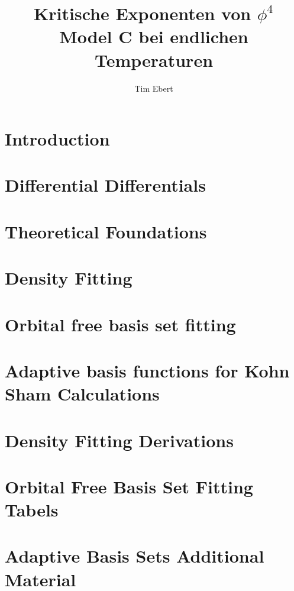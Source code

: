 \documentclass[12pt,twoside]{report}%
\author{Tim Ebert}
\title{Kritische Exponenten von $\phi^4$ Model C bei endlichen Temperaturen}
\begin{document}
\linespread{1.25}


\newpage
\tableofcontents
\chapter{Introduction} \label{chapter:introduction}

\chapter{Differential Differentials}

\chapter{Theoretical Foundations}

\chapter{Density Fitting} \label{chapter:densityfitting}

\chapter{Orbital free basis set fitting} \label{chapter:orbitalfreebasissetfitting}

\chapter{Adaptive basis functions for Kohn Sham Calculations} \label{chapter:adaptivebasisfunctions}

\begin{appendices}
    \chapter{Density Fitting Derivations}
    
    \chapter{Orbital Free Basis Set Fitting Tabels}
    
    \chapter{Adaptive Basis Sets Additional Material}
    
\end{appendices}
\printbibliography[heading=bibintoc, title={Complete bibliography}]
\clearpage
\newpage
%
\end{document}
